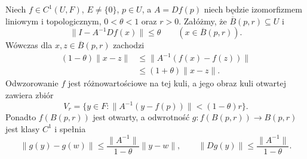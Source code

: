 \begin{stwierdzenie}
\label{ma2:prop:inverse-local-estimates}
Niech $f\in C^1(U,F)$, $E\ne\{0\}$, $p\in U$,
a $A=Df(p)$ niech będzie izomorfizmem liniowym i topologicznym,
$0<\theta<1$ oraz $r>0$. Załóżmy, że
$\overline B(p,r)\subseteq U$ i
\[
 \|I-A^{-1}Df(x)\|\le\theta
 \qquad(x\in\overline B(p,r)).
\]
Wówczas dla $x,z\in\overline B(p,r)$ zachodzi
\[
 \begin{aligned}
 (1-\theta)\|x-z\|&\le
 \|A^{-1}(f(x)-f(z))\|\\
 &\le(1+\theta)\|x-z\|.
 \end{aligned}
\]
Odwzorowanie $f$ jest różnowartościowe na tej kuli,
a jego obraz kuli otwartej zawiera zbiór
\[
 V_r=\{y\in F:\|A^{-1}(y-f(p))\|<(1-\theta)r\}.
\]
Ponadto $f(B(p,r))$ jest otwarty, a odwrotność
$g:f(B(p,r))\to B(p,r)$ jest klasy $C^1$ i spełnia
\[
 \|g(y)-g(w)\|\le
 \frac{\|A^{-1}\|}{1-\theta}\|y-w\|,\qquad
 \|Dg(y)\|\le\frac{\|A^{-1}\|}{1-\theta}.
\]
\end{stwierdzenie}
